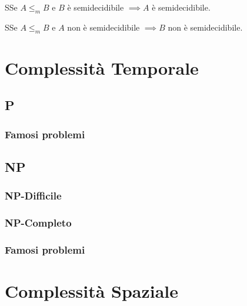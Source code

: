 \documentclass{article}  %
\theoremstyle{definition}
\begin{document}
\begin{theorem}{3.3}
  SSe $A \leq_m B$ e $B$ è semidecidibile $\implies A$ è semidecidibile. 
\end{theorem}
\begin{theorem}{3.4}
  SSe $A \leq_m B$ e $A$ non è semidecidibile $\implies B$ non è semidecidibile. 
\end{theorem}

\section{Complessità Temporale}
\subsection{P}
\subsubsection{Famosi problemi}
\subsection{NP}
\subsubsection{NP-Difficile}
\subsubsection{NP-Completo}
\subsubsection{Famosi problemi}
\section{Complessità Spaziale}
\end{document}
